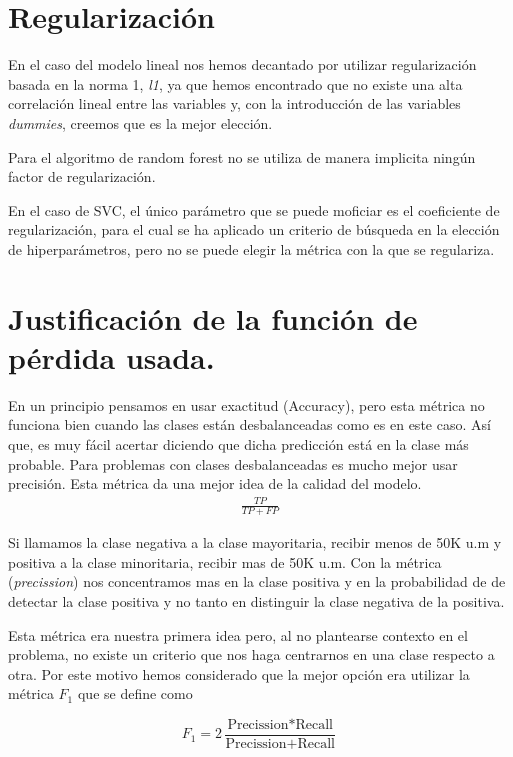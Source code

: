 \documentclass[11pt]{article}
\begin{document}
\section{Regularización}

En el caso del modelo lineal nos hemos decantado por utilizar regularización
basada en la norma 1, \textit{l1}, ya que hemos encontrado que no existe una
alta correlación lineal entre las variables y, con la introducción de las
variables \textit{dummies}, creemos que es la mejor elección. 

Para el algoritmo de random forest no se utiliza de manera implicita ningún
factor de regularización.

En el caso de SVC, el único parámetro que se puede moficiar es el coeficiente de
regularización, para el cual se ha aplicado un criterio de búsqueda en la
elección de hiperparámetros, pero no se puede elegir la métrica con la que se
regulariza.


\section{Justificación de la función de pérdida usada.}

En un principio pensamos en usar exactitud (Accuracy), pero esta métrica no
funciona bien cuando las clases están desbalanceadas como es en este caso. Así
que, es muy fácil acertar diciendo que dicha predicción está en la clase más
probable. Para problemas con clases desbalanceadas es mucho mejor usar
precisión. Esta métrica da una mejor idea de la calidad del modelo. 
\begin{align*}
\frac{TP}{TP+FP}
\end{align*}


Si llamamos la clase negativa a la clase mayoritaria, recibir menos de 50K u.m y
positiva a la clase minoritaria, recibir mas de 50K u.m. Con la métrica
(\textit{precission}) \cite{metrics} nos concentramos mas en la clase positiva y
en la probabilidad de de detectar la clase positiva y no tanto en distinguir la
clase negativa de la positiva.

Esta métrica era nuestra primera idea pero, al no plantearse contexto en el problema,
no existe un criterio que nos haga centrarnos en una clase respecto a otra. Por este 
motivo hemos considerado que la mejor opción era utilizar la métrica $F_1$ 
que se define como 

\[
    F_1 = 2\frac{\text{Precission} * \text{Recall}}{\text{Precission} + \text{Recall}} 
\]
\end{document}

